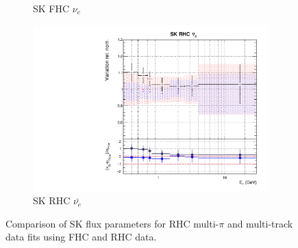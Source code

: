 \begin{figure}[t]
\begin{subfigure}{0.42\textwidth}
  \caption{SK FHC $\nu_{e}$}
\end{subfigure}
\begin{subfigure}{0.42\textwidth}
  \centering
  \includegraphics[width=0.75\linewidth]{figs/rhcmpdat28flux_15}
  \caption{SK RHC $\bar{\nu_{e}}$}
\end{subfigure}
\caption{Comparison of SK flux parameters for RHC multi-$\pi$ and multi-track data fits using FHC and RHC data.}
\label{fig:rhcmpidat28SK}
\end{figure}

